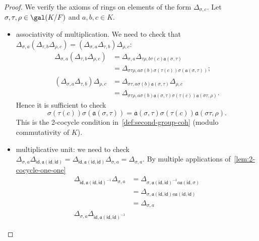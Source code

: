 \begin{proof}
  We verify the axioms of rings on elements of the form $\Delta_{\sigma, c}$. Let $\sigma,\tau,\rho\in\gal(K/F)$ and $a,b,c\in K$.
  \begin{itemize}
    \item associativity of multiplication. We need to check that $\Delta_{\sigma,a}\left(\Delta_{\tau,b}\Delta_{\rho,c}\right) = \left(\Delta_{\sigma,a}\Delta_{\tau,b}\right)\Delta_{\rho,c}$:
          \[
          \begin{aligned}
            \Delta_{\sigma, a}\left(\Delta_{\tau,b}\Delta_{\rho,c}\right)
            &= \Delta_{\sigma,a}\Delta_{\tau\rho,b\tau(c) \mathfrak{a}(\sigma,\tau)}\\
            &= \Delta_{\sigma\tau\rho,a\sigma(b)\sigma(\tau(c)) \sigma(\mathfrak{a}(\sigma, \tau))};\\
            \left(\Delta_{\sigma,a}\Delta_{\tau,b}\right)\Delta_{\rho,c}
            &= \Delta_{\sigma\tau,a\sigma(b)\mathfrak{a}(\sigma,\tau)}\Delta_{\rho,c}\\
            &= \Delta_{\sigma\tau\rho,a\sigma(b)\mathfrak{a}(\sigma, \tau)\sigma(\tau(c))\mathfrak{a}(\sigma\tau, \rho)}.
          \end{aligned}
          \]
          Hence it is sufficient to check
          \[
          \sigma(\tau(c))\sigma(\mathfrak{a}(\sigma,\tau)) =
          \mathfrak{a}(\sigma,\tau)\sigma(\tau(c))\mathfrak{a}(\sigma\tau, \rho).
          \]
          This is the 2-cocycle condition in~\cref{def:second-group-coh} (modulo commutativity of $K$).
    \item multiplicative unit: we need to check $\Delta_{\sigma, a}\Delta_{\mathsf{id},\mathfrak{a}(\mathsf{id}, \mathsf{id})} = \Delta_{\mathsf{id},\mathfrak{a}(\mathsf{id},\mathsf{id})}\Delta_{\sigma, a} = \Delta_{\sigma, a}$. By multiple applications of~\cref{lem:2-cocycle-one-one}
          \[
          \begin{aligned}
            \Delta_{\mathsf{id},\mathfrak{a}(\mathsf{id}, \mathsf{id})^{-1}}\Delta_{\sigma, a}
            &= \Delta_{\sigma, \mathfrak{a}(\mathsf{id}, \mathsf{id})^{-1}a\mathfrak{a}(\mathsf{id},\sigma)}\\
            &= \Delta_{\sigma, \mathfrak{a}(\mathsf{id}, \mathsf{id}) a\mathfrak{a}(\mathsf{id},\mathsf{id})}\\
            &= \Delta_{\sigma, a} \\
            \Delta_{\sigma, a}\Delta_{\mathsf{id},\mathfrak{a}(\mathsf{id},\mathsf{id})^{-1}}

\end{aligned}\]
\end{itemize}
\end{proof}
